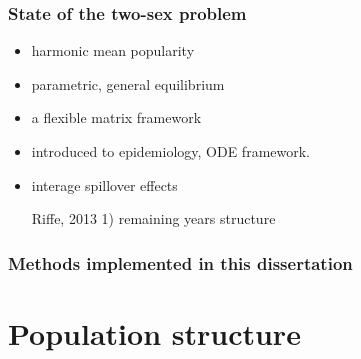 \documentclass{beamer}
\begin{document}
\begin{frame}
  \frametitle{State of the two-sex problem}
  \begin{itemize}
    \item \cite{schoen1977two, schoen1978standardized, schoen1981harmonic} 
    harmonic mean popularity
    \item \cite{marriage1981warren} parametric, general equilibrium
    \item \cite{pollak1986reformulation} a flexible matrix framework
    \item \cite{hadeler1988models, hadeler1989pair} introduced to epidemiology,
    ODE framework.
    \item \cite{choo2006estimating} interage spillover effects
    \item [Riffe, 2013] 1) remaining years structure
  \end{itemize}
  

\end{frame}
\begin{frame}
  \frametitle{Methods implemented in this dissertation}
\end{frame}


\section{Population structure}

\end{document}
